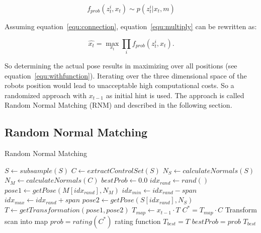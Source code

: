 \documentclass[conference]{IEEEtran}
\begin{document}
\begin{equation}
\label{equ:connection}
f_{prob}(z^i_t, x_t) \sim p \left ( z^i_t|x_t,m \right )
\end{equation}

\noindent Assuming equation~\ref{equ:connection}, equation~\ref{equ:multiply} can be rewritten as:

\begin{equation}
\label{equ:withfunction}
	\widehat{x_t} = \max_{x_t} \prod_i f_{prob}(z^i_t, x_t).
\end{equation}

So determining the actual pose results in maximizing over all positions (see equation~\ref{equ:withfunction}). Iterating over the three dimensional space of the robots position would lead to unacceptable high computational costs. So a randomized approach with $x_{t-1}$ as initial hint is used. The approach is called Random Normal Matching (RNM) and described in the following section.       

\subsection{Random Normal Matching}
\begin{algorithm}
	\caption{Random Normal Matching}\label{euclid}
	\begin{algorithmic}[1]
			\State $S \gets subsample(S)$
			\State $C \gets extractControlSet(S)$
			\State $N_S \gets calculateNormals(S)$
			\State $N_M \gets calculateNormals(C)$
			\State $bestProb \gets 0.0$
				\State $idx_{rand} \gets rand()$
				\State $pose1 \gets getPose(M[idx_{rand}], N_M)$
				\State $idx_{min} \gets idx_{rand} - span$
				\State $idx_{max} \gets idx_{rand} + span$
					\State $pose2 \gets getPose(S[idx_{rand}], N_S)$
					\State $T \gets getTransformation(pose1, pose2)$
					\State $T_{map} \gets x_{t-1} \cdot T$
					\State $C^* = T_{map} \cdot C $ \Comment Transform scan into map
					\State $prob = rating(C^*)$ \Comment rating function
						\State $T_{best} = T$
						\State $bestProb = prob$
					\EndIf
				\EndFor
			\EndFor
			\State \Return $T_{best}$
		\EndFunction
	\end{algorithmic}
\end{algorithm}
\end{document}

